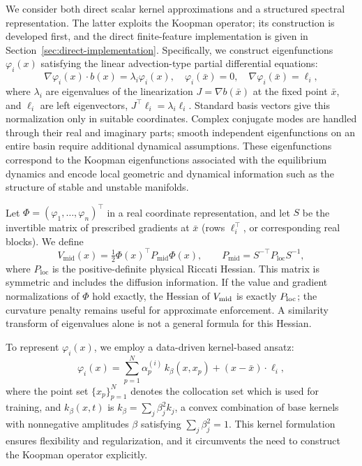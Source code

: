 \documentclass[11pt]{article}
\theoremstyle{plain}      %
\theoremstyle{definition} %
\begin{document}
We consider both direct scalar kernel approximations and a structured spectral representation. The latter exploits the Koopman operator; its construction is developed first, and the direct finite-feature implementation is given in Section~\ref{sec:direct-implementation}. Specifically, we construct eigenfunctions \( \varphi_i(x) \) satisfying the linear advection-type partial differential equations:
\begin{equation}
\nabla \varphi_i(x) \cdot b(x) = \lambda_i \varphi_i(x), \quad \varphi_i(\bar{x}) = 0, \quad \nabla \varphi_i(\bar{x}) = \ell_i,
\end{equation}
where \( \lambda_i \) are eigenvalues of the linearization \( J = \nabla b(\bar{x}) \) at the fixed point \( \bar{x} \), and \(\ell_i\) are left eigenvectors, \(J^\top\ell_i=\lambda_i\ell_i\). Standard basis vectors give this normalization only in suitable coordinates. Complex conjugate modes are handled through their real and imaginary parts; smooth independent eigenfunctions on an entire basin require additional dynamical assumptions. These eigenfunctions correspond to the Koopman eigenfunctions associated with the equilibrium dynamics and encode local geometric and dynamical information such as the structure of stable and unstable manifolds.

Let $\Phi=(\varphi_1,\ldots,\varphi_n)^\top$ in a real coordinate representation, and let $S$ be the invertible matrix of prescribed gradients at $\bar x$ (rows $\ell_i^\top$, or corresponding real blocks). We define
\begin{equation}\label{eq:vmid}
 V_{\mathrm{mid}}(x)=\tfrac12\Phi(x)^\top P_{\mathrm{mid}}\Phi(x),
 \qquad P_{\mathrm{mid}}=S^{-\top}P_{\mathrm{loc}}S^{-1},
\end{equation}
where $P_{\mathrm{loc}}$ is the positive-definite physical Riccati Hessian. This matrix is symmetric and includes the diffusion information. If the value and gradient normalizations of $\Phi$ hold exactly, the Hessian of $V_{\rm mid}$ is exactly $P_{\rm loc}$; the curvature penalty remains useful for approximate enforcement. A similarity transform of eigenvalues alone is not a general formula for this Hessian.

To represent \( \varphi_i(x) \), we employ a data-driven kernel-based ansatz:
\begin{equation}\label{phiix}
\varphi_i(x) = \sum_{p=1}^N \alpha_p^{(i)}\,k_\beta(x, x_p) + (x - \bar{x}) \cdot \ell_i,
\end{equation}
where the point set \( \{ x_p \}_{p=1}^N \) denotes the collocation set which is used for training, and \( k_\beta(x, t) \) is $k_\beta=\sum_j\beta_j^2k_j$, a convex combination of base kernels with nonnegative amplitudes $\beta$ satisfying $\sum_j\beta_j^2=1$. This kernel formulation ensures flexibility and regularization, and it circumvents the need to construct the Koopman operator explicitly.
\end{document}
